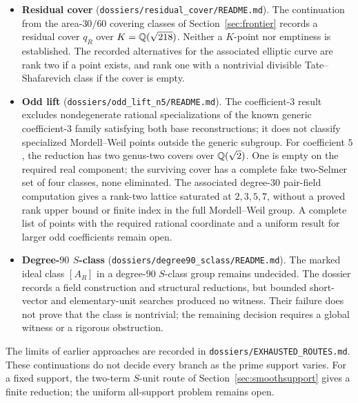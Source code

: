 \begin{itemize}
\item \textbf{Residual cover}
(\texttt{dossiers/}\allowbreak\texttt{residual\_cover/README.md}).
The continuation from the area-$30/60$ covering classes of
Section~\ref{sec:frontier} records a residual cover $q_R$ over
$K=\mathbb{Q}(\sqrt{218})$. Neither a $K$-point nor emptiness is established.
The recorded alternatives for the associated elliptic curve are rank two
if a point exists, and rank one
with a nontrivial divisible Tate--Shafarevich class if the cover is empty.

\item \textbf{Odd lift}
(\texttt{dossiers/}\allowbreak\texttt{odd\_lift\_n5/README.md}).
The coefficient-$3$ result excludes nondegenerate rational
specializations of the known generic coefficient-$3$ family satisfying
both base reconstructions; it does not classify specialized
Mordell--Weil points outside the generic subgroup.
For coefficient $5$, the reduction has two genus-two covers over
$\mathbb{Q}(\sqrt2)$. One is empty on the required real component; the surviving
cover has a complete fake two-Selmer set of four classes, none eliminated.
The associated degree-$30$ pair-field computation gives a rank-two
lattice saturated at $2,3,5,7$, without a proved rank upper bound or finite
index in the full Mordell--Weil group. A complete list of points with the
required rational coordinate and a uniform result for larger odd
coefficients remain open.

\item \textbf{Degree-$90$ $S$-class}
(\texttt{dossiers/}\allowbreak\texttt{degree90\_sclass/README.md}).
The marked ideal class $[A_R]$ in a degree-$90$ $S$-class group remains
undecided. The dossier records a field construction and structural
reductions, but bounded short-vector and elementary-unit searches
produced no witness. Their failure does not prove that the class is
nontrivial; the remaining decision requires a global witness or a
rigorous obstruction.
\end{itemize}

The limits of earlier approaches are recorded in
\texttt{dossiers/}\allowbreak\texttt{EXHAUSTED\_ROUTES.md}.
These continuations do not decide every branch as the prime support
varies. For a fixed support, the two-term $S$-unit route of
Section~\ref{sec:smoothsupport} gives a finite reduction; the uniform
all-support problem remains open.

